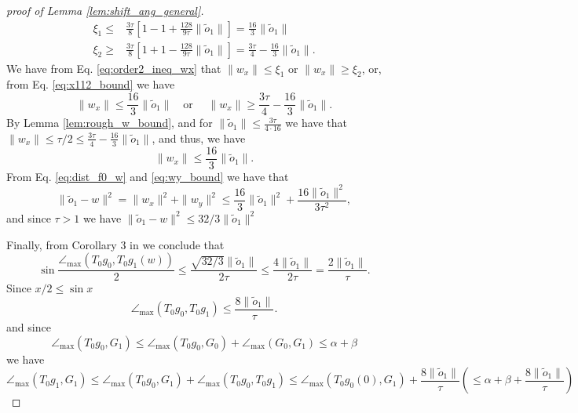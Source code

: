 \documentclass[12pt]{article}
\theoremstyle{remark}
\newcommand{\maxangle}{\angle_{\max}}
\begin{document}
\begin{appendices}
\begin{proof}[proof of Lemma \ref{lem:shift_ang_general}]
\begin{equation} \label{eq:x112_bound}
\begin{array}{ll}
    \xi_1 \leq& \frac{3\tau}{8} \left[1 - 1+\frac{128}{9\tau} \|\tilde o_1\|\right] = \frac{16}{3} \|\tilde o_1\| \\
    \xi_2 \geq &\frac{3\tau}{8} \left[1 + 1-\frac{128}{9\tau} \|\tilde o_1\|\right] = \frac{3\tau}{4} - \frac{16}{3} \|\tilde o_1\|.
\end{array}
\end{equation}
We have from Eq. \eqref{eq:order2_ineq_wx} that $\|w_x\|\leq \xi_1$ or $\|w_x\|\geq \xi_2$, or, from Eq. \eqref{eq:x112_bound} we have 
\[
\|w_x\|\leq \frac{16}{3} \|\tilde o_1\|  \mbox{~~~or~~~~} \|w_x\|\geq \frac{3\tau}{4} - \frac{16}{3} \|\tilde o_1\|.
\]
By Lemma \ref{lem:rough_w_bound}, and for $\|\tilde o_1\| \leq \frac{3\tau}{4 \cdot 16} $  we have that $\|w_x\| \leq \tau/2 \leq \frac{3\tau}{4} - \frac{16}{3} \|\tilde o_1\|$, and thus, we have   
\[
\|w_x\|\leq \frac{16}{3} \|\tilde o_1\|.
\]
From Eq. \eqref{eq:dist_f0_w} and \eqref{eq:wy_bound} we have that 
\[
    \|\tilde o_1-w\|^2 = \|w_x\|^2 + \|w_y\|^2 \leq \frac{16}{3}\|\tilde o_1\|^2 + \frac{16\|\tilde o_1\|^2 }{3\tau^2},
\]
and since $\tau > 1$ we have $\|\tilde o_1-w\|^2 \leq 32/3 \|\tilde o_1\|^2$

Finally, from Corollary 3 in \cite{boissonnat2017reach} we conclude that 
\[
\sin \frac{\maxangle(T_0g_0,T_0g_1(w))}{2} \leq \frac{\sqrt{32/3} \|\tilde o_1\|}{2\tau} \leq \frac{4 \|\tilde o_1\|}{2\tau} = \frac{ 2\|\tilde o_1\|}{\tau}.
\]
Since $x/2 \leq \sin x$
\[
\maxangle(T_0g_0,T_0g_1) \leq \frac{ 8\|\tilde o_1\|}{\tau}. 
\]
and since 
\[
\maxangle (T_0g_0, G_1) \leq \maxangle (T_0g_0, G_0) + \maxangle (G_0, G_1) \leq \alpha + \beta
\]
we have  
\[
\maxangle (T_0g_1, G_1) \leq \maxangle (T_0g_0, G_1) + \maxangle(T_0g_0,T_0g_1)\leq \maxangle(T_0g_0(0),G_1)  + \frac{ 8\|\tilde o_1\|}{\tau} \left(\leq \alpha+\beta +\frac{ 8\|\tilde o_1\|}{\tau}\right)
\]
\end{proof}



\end{appendices}
\end{document}
